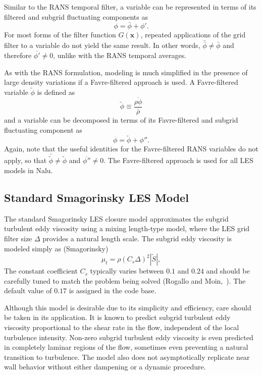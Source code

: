 Similar to the RANS temporal filter, a variable can be represented in 
terms of its filtered and subgrid fluctuating components as
%
\begin{equation}
\phi = \bar{\phi} + \phi'.
\end{equation}
%
For most forms of the filter function $G(\boldsymbol{x})$,
repeated applications of the grid filter to a variable do not yield the
same result.  In other words, $\bar{\bar{\phi}} \ne 
\bar{\phi}$ and therefore $\overline{\phi'} \ne 0$, unlike with the 
RANS temporal averages.

As with the RANS formulation, modeling is much simplified in the
presence of large density variations if a Favre-filtered approach is used.
A Favre-filtered variable $\tilde{\phi}$ is defined as
%
\begin{equation}
\tilde{\phi} \equiv \frac{ \overline{\rho\phi} }{ \bar{\rho} }
\end{equation}
%
and a variable can be decomposed in terms of its Favre-filtered and
subgrid fluctuating component as
%
\begin{equation}
\phi = \tilde{\phi} + \phi''.
\end{equation}
%
Again, note that the useful identities for the Favre-filtered RANS
variables do not apply, so that $\bar{\tilde{\phi}} \ne \tilde{\phi}$
and $\overline{\phi''} \ne 0$.  The Favre-filtered approach is used for
all LES models in Nalu.

\subsection{Standard Smagorinsky LES Model}

The standard Smagorinsky LES closure model approximates the subgrid
turbulent eddy viscosity using a mixing length-type model, where the 
LES grid filter size $\Delta$ provides a natural length scale.  The
subgrid eddy viscosity is modeled simply as (Smagorinsky)
%
\begin{equation}
\mu_t = \rho \left(C_s \Delta \right)^2 | \tilde {S} |,
\label{mut-smag}
\end{equation}
%
The constant coefficient $C_s$ typically varies between $0.1$ and
$0.24$ and should be carefully tuned to match the problem being solved
(Rogallo and Moin,~\cite{Rogallo:1984}).  The default value of $0.17$ is assigned in the code base.

Although this model is desirable due to its simplicity and efficiency,
care should be taken in its application.  It is known to predict subgrid
turbulent eddy viscosity proportional to the shear rate in the flow,
independent of the local turbulence intensity.  Non-zero subgrid turbulent
eddy viscosity is even predicted in completely laminar regions of the
flow, sometimes even preventing a natural transition to turbulence. The model also
does not asymptotically replicate near wall behavior without either dampening or a
dynamic procedure.

